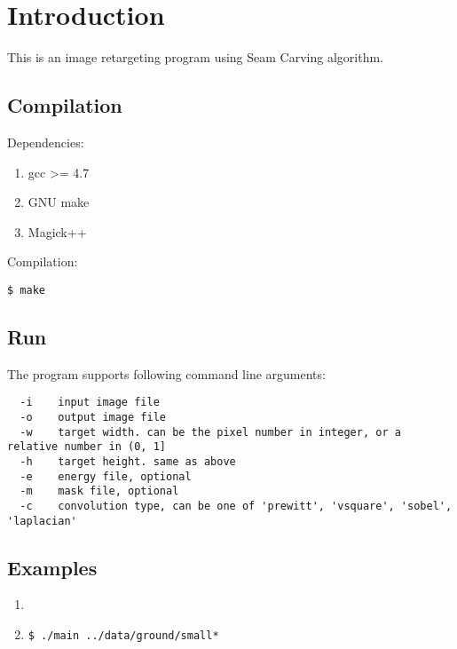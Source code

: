 \section{Introduction}
This is an image retargeting program using Seam Carving\cite{sc} algorithm.

\subsection{Compilation}
Dependencies:

\begin{enumerate}
    \item gcc >= 4.7
    \item GNU make
    \item Magick++
\end{enumerate}

Compilation:
\begin{lstlisting}
$ make
\end{lstlisting}

\subsection{Run}
The program supports following command line arguments:
\begin{lstlisting}
  -i    input image file
  -o    output image file
  -w    target width. can be the pixel number in integer, or a relative number in (0, 1]
  -h    target height. same as above
  -e    energy file, optional
  -m    mask file, optional
  -c    convolution type, can be one of 'prewitt', 'vsquare', 'sobel', 'laplacian'
\end{lstlisting}

\subsection{Examples}
\begin{enumerate}
\item


  \item
    \begin{lstlisting}
$ ./main ../data/ground/small*
    \end{lstlisting}
\end{enumerate}

